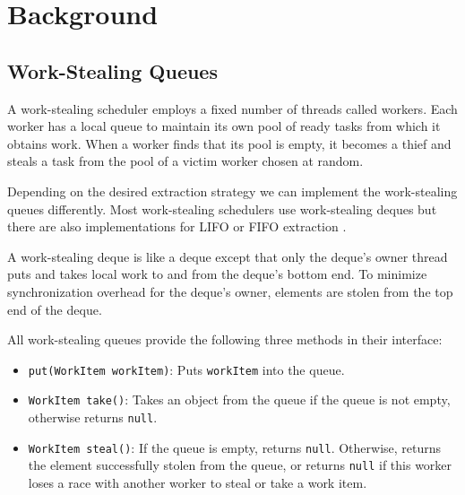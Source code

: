 
\chapter{Background}
\label{chap:queues-background}

\section{Work-Stealing Queues}
\label{sec:queues-background-work-stealing-queues}

A work-stealing scheduler employs a fixed number of threads called
workers. Each worker has a local queue to maintain its own pool of
ready tasks from which it obtains work. When a worker finds that its
pool is empty, it becomes a thief and steals a task from the pool of a
victim worker chosen at random.

Depending on the desired extraction strategy we can implement the
work-stealing queues differently. Most work-stealing schedulers use
work-stealing deques \cite{Arora2001, Acar2002, Blumofe1995,
  Frigo1998, Danaher2005} but there are also implementations for LIFO
or FIFO extraction \cite{Michael2009}.

A work-stealing deque is like a deque \cite{Knuth1997} except that
only the deque's owner thread puts and takes local work to and from
the deque's bottom end. To minimize synchronization overhead for the
deque's owner, elements are stolen from the top end of the deque.

All work-stealing queues provide the following three methods in their
interface:

\begin{itemize}
\item \lstinline!put(WorkItem workItem)!: Puts \lstinline!workItem!
  into the queue.
\item \lstinline!WorkItem take()!: Takes an object from the queue if
  the queue is not empty, otherwise returns \lstinline!null!.
\item \lstinline!WorkItem steal()!: If the queue is empty, returns
  \lstinline!null!. Otherwise, returns the element successfully stolen
  from the queue, or returns \lstinline!null! if this worker loses a
  race with another worker to steal or take a work item.
\end{itemize}

